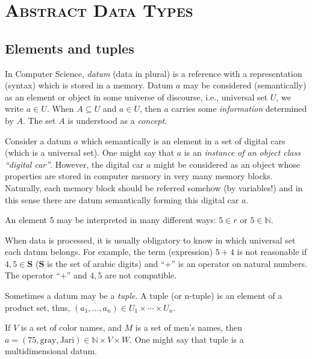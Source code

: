 \chapter{\textsc{Abstract Data Types}}
\section{Elements and tuples}
In Computer Science, \emph{datum} (data in plural) is a reference with a representation (syntax)  which is stored in a memory. Datum $a$ may be considered (semantically) as an element or object in some universe of discourse, i.e., universal set $U$, we write $a \in U$. When $A \subseteq U$ and $a \in U$, then $a$ carries some \emph{information} determined by $A$. The set $A$ is understood as a \emph{concept}.

\begin{example}
Consider a datum $a$ which semantically is an element in a set of digital cars (which is a universal set). One might say that $a$ is an \emph{instance of an object class ``digital car''}. However, the digital car $a$ might be considered as an object whose properties are stored in computer memory in very many memory blocks. Naturally, each memory block should be referred somehow (by variables!) and in this sense there are datum semantically forming this digital car $a$.
\end{example}

\begin{example}
An element 5 may be interpreted in many different ways: $5 \in r$ or $5 \in \mathbb{N}$.
\end{example}

\begin{example}
When data is processed, it is usually obligatory to know in which universal set each datum belongs. For example, the term (expression) $5+4$ is not reasonable if $4,5 \in \mathbf{S}$ ($\mathbf{S}$ is the set of arabic digits) and ``$+$'' is an operator on natural numbers. The operator ``$+$'' and $4,5$ are not compatible.
\end{example}

Sometimes a datum may be a \emph{tuple}. A tuple (or n-tuple) is an element of a product set, thus, $\left(a_1, \dots ,a_n \right) \in U_1 \times\cdots\times U_n$.

\begin{example}
If $V$ is a set of color names, and $M$ is a set of men's names, then $a=\left(75,\text{gray},\text{Jari} \right) \in \mathbb{N} \times V \times W$. One might say that tuple is a multidimensional datum.
\end{example}

